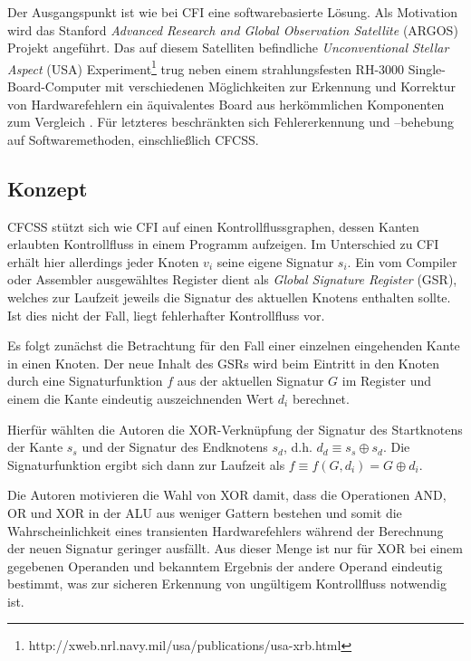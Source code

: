 \documentclass[11pt]{article}
\begin{document}
Der Ausgangspunkt ist wie bei CFI eine softwarebasierte Lösung. Als Motivation
wird das Stanford \emph{Advanced Research and Global Observation Satellite}
(ARGOS) Projekt angeführt. Das auf diesem Satelliten befindliche
\emph{Unconventional Stellar Aspect} (USA)
Experiment\footnote{http://xweb.nrl.navy.mil/usa/publications/usa-xrb.html}
trug neben einem strahlungsfesten RH-3000 Single-Board-Computer mit
verschiedenen Möglichkeiten zur Erkennung und Korrektur von Hardwarefehlern ein
äquivalentes Board aus herkömmlichen Komponenten zum
Vergleich \cite{argos-2002-lessons}. Für letzteres beschränkten sich
Fehlererkennung und –behebung auf Softwaremethoden, einschließlich CFCSS.

\subsection{Konzept}

CFCSS stützt sich wie CFI auf einen Kontrollflussgraphen, dessen Kanten
erlaubten Kontrollfluss in einem Programm aufzeigen. Im Unterschied zu CFI
erhält hier allerdings jeder Knoten $v_i$ seine eigene Signatur $s_i$. Ein vom
Compiler oder Assembler ausgewähltes Register dient als \emph{Global Signature
Register} (GSR), welches zur Laufzeit jeweils die Signatur des aktuellen
Knotens enthalten sollte. Ist dies nicht der Fall, liegt fehlerhafter
Kontrollfluss vor.

Es folgt zunächst die Betrachtung für den Fall einer einzelnen eingehenden
Kante in einen Knoten. Der neue Inhalt des GSRs wird beim Eintritt in den
Knoten durch eine Signaturfunktion $f$ aus der aktuellen Signatur $G$ im
Register und einem die Kante eindeutig auszeichnenden Wert $d_i$ berechnet.

Hierfür wählten die Autoren die XOR-Verknüpfung der Signatur des Startknotens
der Kante $s_s$ und der Signatur des Endknotens $s_d$, d.h. $d_d \equiv s_s
\oplus s_d$. Die Signaturfunktion ergibt sich dann zur Laufzeit als $f \equiv
f(G, d_i) = G \oplus d_i$.

Die Autoren motivieren die Wahl von XOR damit, dass die Operationen AND, OR und
XOR in der ALU aus weniger Gattern bestehen und somit die Wahrscheinlichkeit
eines transienten Hardwarefehlers während der Berechnung der neuen Signatur
geringer ausfällt. Aus dieser Menge ist nur für XOR bei einem gegebenen
Operanden und bekanntem Ergebnis der andere Operand eindeutig bestimmt, was zur
sicheren Erkennung von ungültigem Kontrollfluss notwendig ist.
\end{document}
